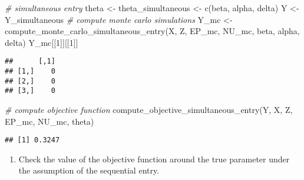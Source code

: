 \documentclass[
]{article}
\newenvironment{Shaded}{\begin{snugshade}}{\end{snugshade}}
\newcommand{\CommentTok}[1]{\textcolor[rgb]{0.56,0.35,0.01}{\textit{#1}}}
\newcommand{\DecValTok}[1]{\textcolor[rgb]{0.00,0.00,0.81}{#1}}
\newcommand{\FunctionTok}[1]{\textcolor[rgb]{0.00,0.00,0.00}{#1}}
\newcommand{\NormalTok}[1]{#1}
\newcommand{\OtherTok}[1]{\textcolor[rgb]{0.56,0.35,0.01}{#1}}
\providecommand{\tightlist}{%
  \setlength{\itemsep}{0pt}\setlength{\parskip}{0pt}}
\begin{document}
\begin{Shaded}
\begin{Highlighting}[]
\CommentTok{\# simultaneous entry}
\NormalTok{theta }\OtherTok{\textless{}{-}}\NormalTok{ theta\_simultaneous }\OtherTok{\textless{}{-}}
  \FunctionTok{c}\NormalTok{(beta, alpha, delta)}
\NormalTok{Y }\OtherTok{\textless{}{-}}\NormalTok{ Y\_simultaneous}
\CommentTok{\# compute monte carlo simulations}
\NormalTok{Y\_mc }\OtherTok{\textless{}{-}} \FunctionTok{compute\_monte\_carlo\_simultaneous\_entry}\NormalTok{(X, Z, EP\_mc, NU\_mc, beta, alpha, delta)}
\NormalTok{Y\_mc[[}\DecValTok{1}\NormalTok{]][[}\DecValTok{1}\NormalTok{]]}
\end{Highlighting}
\end{Shaded}

\begin{verbatim}
##      [,1]
## [1,]    0
## [2,]    0
## [3,]    0
\end{verbatim}

\begin{Shaded}
\begin{Highlighting}[]
\CommentTok{\# compute objective function}
\FunctionTok{compute\_objective\_simultaneous\_entry}\NormalTok{(Y, X, Z, EP\_mc, NU\_mc, theta)}
\end{Highlighting}
\end{Shaded}

\begin{verbatim}
## [1] 0.3247
\end{verbatim}

\begin{enumerate}
\def\labelenumi{\arabic{enumi}.}
\setcounter{enumi}{3}
\tightlist
\item
  Check the value of the objective function around the true parameter
  under the assumption of the sequential entry.
\end{enumerate}
\end{document}
